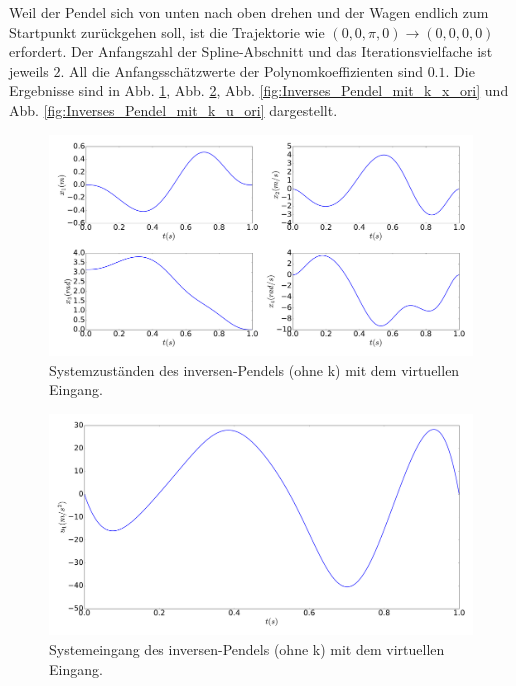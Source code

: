 \begin{beispiel}
	Weil der Pendel sich von unten nach oben drehen und der Wagen endlich zum Startpunkt zurückgehen soll, ist die Trajektorie wie $\left ( 0,0,\pi ,0 \right )\rightarrow \left ( 0,0,0,0 \right )$ erfordert. Der Anfangszahl der Spline-Abschnitt und das Iterationsvielfache ist jeweils $2$. All die Anfangsschätzwerte der Polynomkoeffizienten sind $0.1$. Die Ergebnisse sind in Abb. \ref{fig:Inverses_Pendel_ohne_k_x}, Abb. \ref{fig:Inverses_Pendel_ohne_k_u}, Abb. \ref{fig:Inverses_Pendel_mit_k_x_ori} und Abb. \ref{fig:Inverses_Pendel_mit_k_u_ori} dargestellt.
	
	\begin{figure}
		\centering
		\includegraphics[width=15.5cm]{bild/30_32/example0_ohne_k_x.pdf}
		\caption{Systemzuständen des inversen-Pendels (ohne k) mit dem virtuellen Eingang.}
		\label{fig:Inverses_Pendel_ohne_k_x}
	\end{figure}

	\begin{figure}
		\centering
		\includegraphics[width=12cm]{bild/30_32/example0_ohne_k_u.pdf}
		\caption{Systemeingang des inversen-Pendels (ohne k) mit dem virtuellen Eingang.}
		\label{fig:Inverses_Pendel_ohne_k_u}
	\end{figure}


\end{beispiel}
